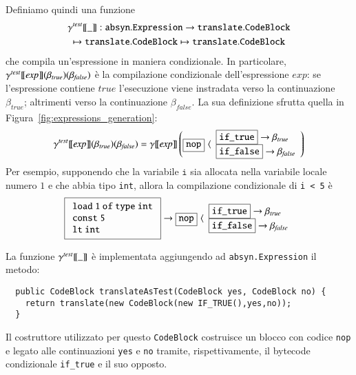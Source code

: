 Definiamo quindi una funzione
%
\begin{multline*}
  {\gamma^{\mathit{test}}[\![{\_}]\!]}{}{}:\mathtt{absyn.Expression}\to
    \mathtt{translate.CodeBlock}\\
  \mapsto\mathtt{translate.CodeBlock}
    \mapsto\mathtt{translate.CodeBlock}
\end{multline*}
%
che compila un'espressione in maniera condizionale.
In particolare, ${\gamma^{\mathit{test}}[\![{\mathit{exp}}]\!]}(\beta_\mathit{true})
(\beta_\mathit{false})$ \`e la
compilazione condizionale dell'espressione $\mathit{exp}$:
se l'espressione contiene $\mathit{true}$ l'esecuzione
viene instradata verso la continuazione $\beta_\mathit{true}$;
altrimenti verso la continuazione $\beta_\mathit{false}$.
La sua definizione sfrutta quella in Figura~\ref{fig:expressions_generation}:
%
\begin{equation}\label{eq:conditional_compilation}
  {\gamma^{\mathit{test}}[\![{\mathit{exp}}]\!]}(\beta_{\mathit{true}})(\beta_\mathit{false})=
    {\gamma[\![{\mathit{exp}}]\!]}\left(
      \fbox{$\mathtt{nop}$}\,\,\langle
    \begin{array}{l}
        \fbox{$\mathtt{if\_true}$}\to\beta_{\mathit{true}}\\
        \fbox{$\mathtt{if\_false}$}\to\beta_\mathit{false}
    \end{array}
    \right)
\end{equation}
%
Per esempio, supponendo che la variabile $\mathtt{i}$ sia allocata nella
variabile locale numero $1$ e che abbia tipo \texttt{int},
allora la compilazione condizionale di \texttt{i < 5} \`e
%
\[
  \fbox{$
  \begin{array}{l}
    \mathtt{load\ 1\ of\ type\ int}\\
    \mathtt{const\ 5}\\
    \mathtt{lt\ int}
  \end{array}
  $}\to
  \fbox{$\mathtt{nop}$}\,\,\langle
    \begin{array}{l}
        \fbox{$\mathtt{if\_true}$}\to\beta_{\mathit{true}}\\
        \fbox{$\mathtt{if\_false}$}\to\beta_\mathit{false}
    \end{array}
\]

La funzione ${\gamma^{\mathit{test}}[\![{\_}]\!]}$ \`e implementata
aggiungendo ad \texttt{absyn.Expression} il metodo:
%
\begin{verbatim}
  public CodeBlock translateAsTest(CodeBlock yes, CodeBlock no) {
    return translate(new CodeBlock(new IF_TRUE(),yes,no));
  }
\end{verbatim}
%
Il costruttore utilizzato per questo \texttt{CodeBlock} costruisce
un blocco con codice \texttt{nop} e legato alle continuazioni
\texttt{yes} e \texttt{no} tramite, rispettivamente, il bytecode condizionale
\texttt{if\_true} e il suo opposto.

